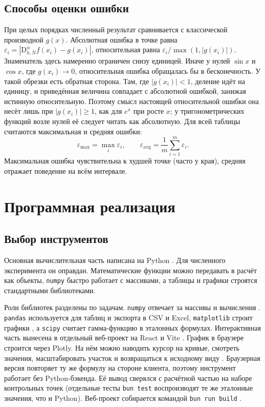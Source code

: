 \documentclass[14pt,a4paper]{extarticle}
\newcommand{\D}{\mathrm{D}}
\begin{document}
\subsection{Способы оценки ошибки}

При целых порядках численный результат сравнивается с классической производной $g(x)$. Абсолютная ошибка в точке равна $\varepsilon_i=|\D^{\alpha}_{h,N}f(x_i)-g(x_i)|$, относительная равна $\varepsilon_i/\max(1,|g(x_i)|)$. Знаменатель здесь намеренно ограничен снизу единицей. Иначе у нулей $\sin x$ и $\cos x$, где $g(x_i)\to0$, относительная ошибка обращалась бы в бесконечность. У такой обрезки есть обратная сторона. Там, где $|g(x_i)|<1$, деление идёт на единицу, и приведённая величина совпадает с абсолютной ошибкой, занижая истинную относительную. Поэтому смысл настоящей относительной ошибки она несёт лишь при $|g(x_i)|\geqslant1$, как для $e^x$ при росте $x$; у тригонометрических функций возле нулей её следует читать как абсолютную. Для всей таблицы считаются максимальная и средняя ошибки:
\begin{equation}
\varepsilon_{\max}=\max_i\varepsilon_i,\qquad \varepsilon_{\text{avg}}=\frac{1}{m}\sum_{i=1}^{m}\varepsilon_i.
\end{equation}
Максимальная ошибка чувствительна к худшей точке (часто у края), средняя отражает поведение на всём интервале.

\section{Программная реализация}

\subsection{Выбор инструментов}

Основная вычислительная часть написана на Python \cite{pydoc}. Для численного эксперимента он оправдан. Математические функции можно передавать в расчёт как объекты, \texttt{numpy} быстро работает с массивами, а таблицы и графики строятся стандартными библиотеками.

Роли библиотек разделены по задачам. \texttt{numpy} отвечает за массивы и вычисления \cite{harris, numpydoc}. \texttt{pandas} используется для таблиц и экспорта в CSV и Excel, \texttt{matplotlib} строит графики \cite{hunter}, а \texttt{scipy} считает гамма-функцию в эталонных формулах. Интерактивная часть вынесена в отдельный веб-проект на React и Vite \cite{reactdoc, vitedoc}. График в браузере строится через Plotly. На нём можно наводить курсор на кривые, смотреть значения, масштабировать участок и возвращаться к исходному виду \cite{plotlydoc}. Браузерная версия повторяет ту же формулу на стороне клиента, поэтому инструмент работает без Python-бэкенда. Её вывод сверялся с расчётной частью на наборе контрольных точек (отдельные тесты \texttt{bun test} воспроизводят те же эталонные значения, что и Python). Веб-проект собирается командой \texttt{bun run build} \cite{bundoc}.
\end{document}
